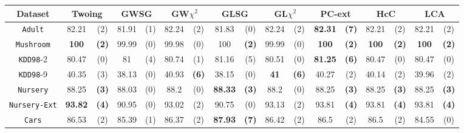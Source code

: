 \begin{sidewaystable*}[ph!]
\centering
\begin{tabular}{c|cc|cc|cc|cc|cc|cc|cc|cc} 
Dataset & \multicolumn{2}{c|}{Twoing} &  \multicolumn{2}{c|}{GWSG}  
&   \multicolumn{2}{c|}{GW$\chi^2$}                   &\multicolumn{2}{c|}{GLSG}       &\multicolumn{2}{c|}{GL$\chi^2$} & \multicolumn{2}{c|}{PC-ext} & \multicolumn{2}{c|}{HcC}& \multicolumn{2}{c}{LCA}\\
\hline 
{\tt Adult}         & 82.21    & (2)    & 81.91    & (1)    & 82.24    & (2)    & 81.83    & (0)    & 82.24    & (2)    &{\bf82.31}&{\bf(7)}          & 82.21    & (2)      & 82.21    & (2)      \\
{\tt Mushroom}      & {\bf 100}&{\bf(2)}& 99.99    & (0)    & 99.98    & (0)    & 100      &{\bf(2)}& 99.99    & (0)    &{\bf 100} &{\bf(2)}          &{\bf100}  & {\bf(2)} & {\bf100} & {\bf(2)} \\
{\tt KDD98}-2       & 80.47    & (0)    & 81       & (4)    & 80.74    & (1)    & 81.16    & (5)    & 80.51    & (0)    &{\bf81.25}&{\bf(6)}          & 80.47    & (0)      & 80.47    & (0)      \\
{\tt KDD98}-9       & 40.35    & (3)    & 38.13    & (0)    & 40.93    &{\bf(6)}& 38.15    & (0)    &{\bf 41 } &{\bf(6)}& 40.27    & (2)              & 40.14    & (2)      & 39.96    & (2)      \\
{\tt Nursery}       & 88.25    &{\bf(3)}& 88.03    & (0)    & 88.2     & (0)    &{\bf88.33}&{\bf(3)}& 88.2     & (0)    & 88.25    &{\bf(3)}          & 88.25    & {\bf(3)} & 88.25    & {\bf(3)} \\
{\tt Nursery-Ext}   &{\bf93.82}&{\bf(4)}& 90.95    & (0)    & 93.02    & (2)    & 90.75    & (0)    & 93.13    & (2)    & 93.81    &{\bf(4)}          & 93.81    & {\bf(4)} & 93.81    & {\bf(4)} \\
{\tt Cars}          & 86.53    & (2)    & 85.39    & (1)    & 86.37    & (2)    &{\bf87.93}&{\bf(7)}& 86.42    & (2)    & 86.5     & (2)              & 86.5     & (2)      & 84.55    & (0)      \\

\end{tabular}
\end{sidewaystable*}
